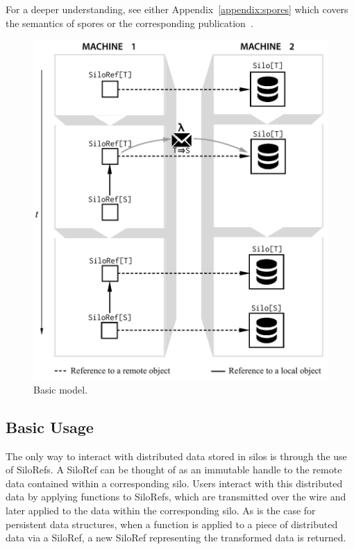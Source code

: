 \documentclass[preprint]{sigplanconf}
\theoremstyle{definition}
\theoremstyle{definition}
\begin{document}
For a deeper understanding, see either Appendix~\ref{appendix:spores} which
covers the semantics of spores or the corresponding publication~\cite{Spores}.

\begin{figure}[t!]
\centering\includegraphics[width=0.8\columnwidth]{basic-diagram.pdf}
\caption{Basic model.}\label{fig:basic-diagram}
\end{figure}

\subsection{Basic Usage}

The only way to interact with distributed data stored in silos is through the
use of SiloRefs. A SiloRef can be thought of as an immutable handle to the
remote data contained within a corresponding silo. Users interact with this
distributed data by applying functions to SiloRefs, which are transmitted over
the wire and later applied to the data within the corresponding silo. As is
the case for persistent data structures, when a function is applied to a piece
of distributed data via a SiloRef, a new SiloRef representing the transformed
data is returned.
\end{document}
